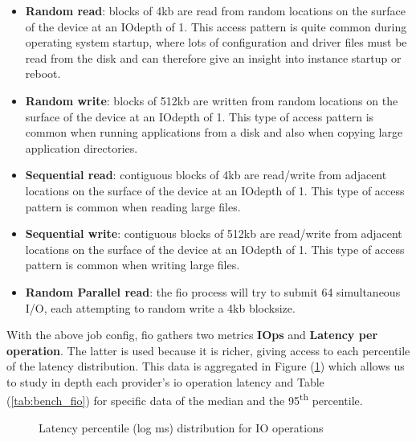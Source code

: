 \documentclass[11pt]{article}
\begin{document}
\begin{itemize}
    \item \textbf{Random read}: blocks of 4kb are read from random locations on the surface of the device at an IOdepth of 1. This access pattern is quite common during operating system startup, where lots of configuration and driver files must be read from the disk and can therefore give an insight into instance startup or reboot. 
    \item \textbf{Random write}: blocks of 512kb are written from random locations on the surface of the device at an IOdepth of 1. This type of access pattern is common when running applications from a disk and also when copying large application directories.
    \item \textbf{Sequential read}: contiguous blocks of 4kb are read/write from adjacent locations on the surface of the device at an IOdepth of 1. This type of access pattern is common when reading large files. 
    \item \textbf{Sequential write}: contiguous blocks of 512kb are read/write from adjacent locations on the surface of the device at an IOdepth of 1. This type of access pattern is common when writing large files.
    \item \textbf{Random Parallel read}: the fio process will try to submit 64 simultaneous I/O, each attempting to random write a 4kb blocksize. 
\end{itemize}

With the above job config, fio gathers two metrics \textbf{IOps} and \textbf{Latency per operation}. The latter is used because it is richer, giving access to each percentile of the latency distribution. This data is aggregated in Figure (\ref{fig:bench_fio}) which allows us to study in depth each provider's io operation latency and Table (\ref{tab:bench_fio}) for specific data of the median and the 95\textsuperscript{th} percentile.

\begin{figure}[!h]
    \centering
    \newline
    \newline

    \caption{Latency percentile (log ms) distribution for IO operations}
    \label{fig:bench_fio}
\end{figure}
\end{document}
